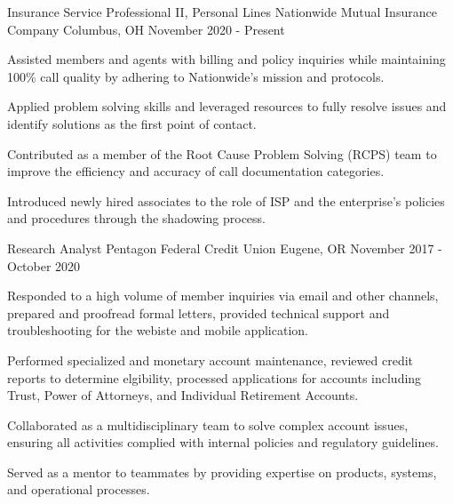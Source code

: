 
\begin{cventries}

  \cventry
    {Insurance Service Professional II, Personal Lines} %
    {Nationwide Mutual Insurance Company} %
    {Columbus, OH} %
    {November 2020 - Present} %
    {
      \begin{cvitems} %
        \item{Assisted members and agents with billing and policy inquiries while maintaining 100\% call quality by adhering to Nationwide's mission and protocols.}
        \item{Applied problem solving skills and leveraged resources to fully resolve issues and identify solutions as the first point of contact.}
        \item{Contributed as a member of the Root Cause Problem Solving (RCPS) team to improve the efficiency and accuracy of call documentation categories.}
        \item{Introduced newly hired associates to the role of ISP and the enterprise's policies and procedures through the shadowing process.}
         	\end{cvitems}
    } 

  \cventry
    {Research Analyst} %
    {Pentagon Federal Credit Union} %
    {Eugene, OR} %
    {November 2017 - October 2020} %
    {
      \begin{cvitems} %
        \item {Responded to a high volume of member inquiries via email and other channels, prepared and proofread formal letters, provided technical support and troubleshooting for the webiste and mobile application.}
        \item {Performed specialized and monetary account maintenance, reviewed credit reports to determine elgibility, processed applications for accounts including Trust, Power of Attorneys, and Individual Retirement Accounts.}
        \item {Collaborated as a multidisciplinary team to solve complex account issues, ensuring all activities complied with internal policies and regulatory guidelines.}
        \item {Served as a mentor to teammates by providing expertise on products, systems, and operational processes.}
         	\end{cvitems}
    } 


\end{cventries}
